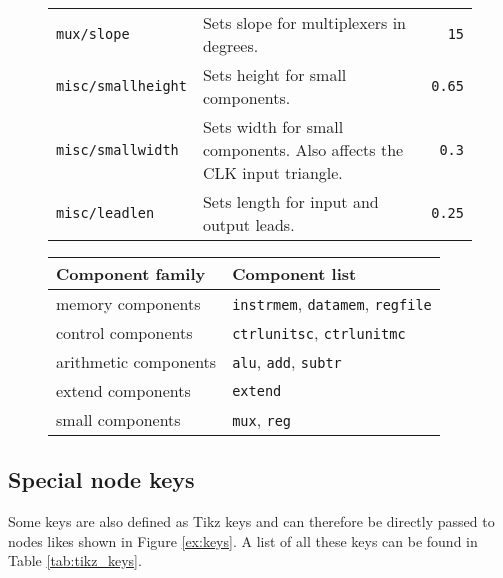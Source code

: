 \documentclass[.52pt,a4paper,titlepage]{article}
\begin{document}
\begin{figure}[htbp]
\begin{tabularx}{\textwidth}{|lXr|}
		\texttt{mux/slope}        & Sets slope for multiplexers in degrees.                               & \texttt{15}      \\
		\texttt{misc/smallheight} & Sets height for small components.                                     & \texttt{0.65}    \\
		\texttt{misc/smallwidth}  & Sets width for small components. Also affects the CLK input triangle. & \texttt{0.3}     \\
		\texttt{misc/leadlen}     & Sets length for input and output leads.                               & \texttt{0.25}    \\
		\hline
	\end{tabularx}
	\label{tab:keys}
\end{figure}

\begin{figure}[htbp]
	\begin{tabularx}{\textwidth}{|lX|}
		\hline
		Component family      & Component list                                        \\
		\hline
		memory components     & \texttt{instrmem}, \texttt{datamem}, \texttt{regfile} \\
		control components    & \texttt{ctrlunitsc}, \texttt{ctrlunitmc}              \\
		arithmetic components & \texttt{alu}, \texttt{add}, \texttt{subtr}            \\
		extend components     & \texttt{extend}                                       \\
		small components      & \texttt{mux}, \texttt{reg}                            \\
		\hline
	\end{tabularx}
	\label{tab:families}
\end{figure}
\subsection{Special node keys}
Some keys are also defined as  Tikz keys and can therefore be directly passed to nodes likes shown in Figure \ref{ex:keys}. A list of all these keys can be found in Table \ref{tab:tikz_keys}.
\end{document}
